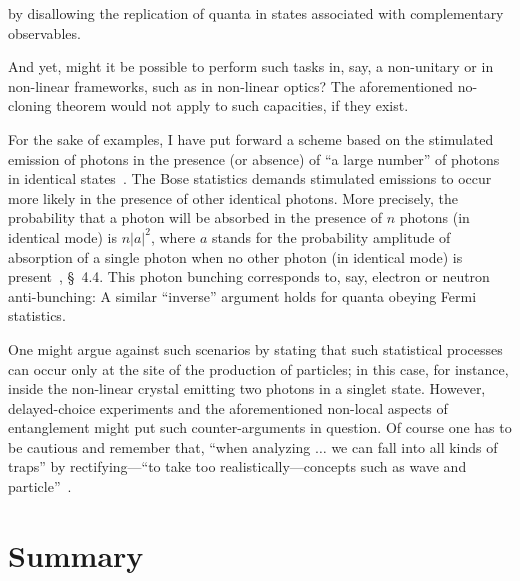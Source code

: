 \documentclass[entropy,article,accept,oneauthor,pdftex]{Definitions/mdpi}
\begin{document}
 by disallowing the replication of quanta in states associated with
complementary observables.


And yet, might it be possible to perform such tasks in, say, a non-unitary or in non-linear frameworks, such as in non-linear optics?
The aforementioned no-cloning theorem would not apply to such capacities, if they exist.

For the sake of examples, I have put forward a scheme based on the stimulated emission of photons in the presence (or absence) of
``a large number'' of photons in identical states~\cite{svozil-slash}. The Bose statistics demands stimulated emissions to occur more likely in the presence of other identical photons. More precisely, the probability that a photon will be absorbed in the presence of $n$ photons (in identical mode)
is $n \vert a \vert^2$, where $a$ stands for the probability amplitude of absorption of a single photon when no other photon (in identical mode)
is present~\cite{feynman-III}, \S~4.4.
This photon bunching corresponds to, say, electron or neutron anti-bunching:
A similar ``inverse'' argument holds for quanta obeying Fermi statistics.

One might argue against such scenarios by stating that such statistical processes can occur only at the site of the production of particles;
in this case, for instance, inside the non-linear crystal emitting two photons in a singlet state.
However, delayed-choice experiments and the aforementioned non-local aspects of entanglement might put such counter-arguments in question.
Of course one has to be cautious and remember that, ``when analyzing $\ldots$ we can fall into all kinds of traps'' by rectifying---``to take too realistically---concepts
such as wave and particle''~\cite{Zeilinger2005-kj}.


\section{Summary}
\end{document}
